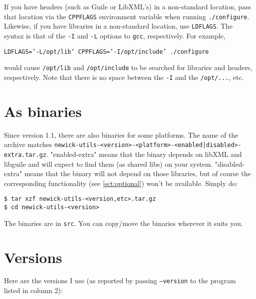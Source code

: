 If you have headers (such as Guile or LibXML's) in a non-standard location, pass
that location via the \texttt{CPPFLAGS} environment variable when running
\texttt{./configure}. Likewise, if you have libraries in a non-standard
location, use \texttt{LDFLAGS}. The syntax is that of the \texttt{-I} and
\texttt{-L} options to \texttt{gcc}, respectively. For example,

\texttt{LDFLAGS='-L/opt/lib' CPPFLAGS='-I/opt/include' ./configure}

would cause \texttt{/opt/lib} and \texttt{/opt/include} to be searched for
libraries and headers, respectively. Note that there is no space between the
\texttt{-I} and the \texttt{/opt/...}, etc.

\section{As binaries}

Since version 1.1, there are also binaries for some platforms. The name of the
archive matches
\texttt{newick-utils-<version>-<platform>-<enabled|disabled>-extra.tar.gz}.
"enabled-extra" means that the binary depends on libXML and libguile and will
expect to find them (as shared libs) on your system. "disabled-extra" means that
the binary will not depend on those libraries, but of course the corresponding
functionality (see \ref{sct:optional}) won't be available. Simply do:

\begin{verbatim}
$ tar xzf newick-utils-<version,etc>.tar.gz
$ cd newick-utils-<version>
\end{verbatim}

\noindent{}The binaries are in \texttt{src}. You can copy/move the binaries
wherever it suits you.

\section{Versions}
\label{sct:versions}

\noindent{}Here are the versions I use (as reported by passing
\texttt{--version} to the program listed in column 2):

